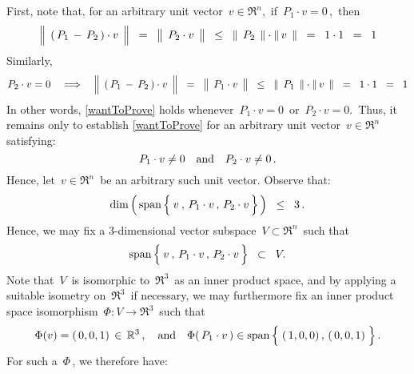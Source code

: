 First, note that, for an arbitrary unit vector \,$v \in \Re^{n}$,\,
if \,$P_{1} \cdot v = 0$\,,\, then
\begin{equation*}
\left\Vert\;\, (\,P_{1} \,\overset{{\color{white}.}}{-}\, P_{2}\,)\cdot v \,\;\right\Vert
\;\; = \;\;
	\left\Vert\;\, P_{2} \overset{{\color{white}.}}{\cdot} v \,\;\right\Vert
\;\; \leq \;\;
	\left\Vert\;\, P_{2} \,\;\right\Vert
	\cdot
	\left\Vert\, v \,\;\right\Vert
\;\; = \;\;
	1 \cdot 1
\;\; = \;\;
	1
\end{equation*}
Similarly,
\begin{equation*}
P_{2} \cdot v = 0
\quad\Longrightarrow\quad
\left\Vert\;\, (\,P_{1} \,\overset{{\color{white}.}}{-}\, P_{2}\,)\cdot v \,\;\right\Vert
\;\; = \;\;
	\left\Vert\;\, P_{1} \overset{{\color{white}.}}{\cdot} v \,\;\right\Vert
\;\; \leq \;\;
	\left\Vert\;\, P_{1} \,\;\right\Vert
	\cdot
	\left\Vert\, v \,\;\right\Vert
\;\; = \;\;
	1 \cdot 1
\;\; = \;\;
	1
\end{equation*}
In other words, \eqref{wantToProve} holds whenever
\,$P_{1}\cdot v = 0$\, or \,$P_{2}\cdot v = 0$.\,
Thus, it remains only to establish \eqref{wantToProve}
for an arbitrary unit vector \,$v \in \Re^{n}$\, satisfying:
\begin{equation}\label{caseAssumption}
P_{1} \cdot v \neq 0
\quad\textnormal{and}\quad
P_{2} \cdot v \neq 0\,.
\end{equation}
Hence, let \,$v \in \Re^{n}$\, be an arbitrary such unit vector.
Observe that:
\begin{equation*}
\dim\left(\,\span\left\{\,\overset{{\color{white}-}}{v} \,,\, P_{1}\cdot v \,,\, P_{2}\cdot v\,\right\}\,\right)
\;\; \leq \;\;
	3\,.
\end{equation*}
Hence, we may fix a $3$-dimensional vector subspace \,$V \subset \Re^{n}$\, such that
\begin{equation*}
\span\left\{\,\overset{{\color{white}-}}{v} \,,\, P_{1}\cdot v \,,\, P_{2}\cdot v\,\right\}
\;\; \subset \;\;
	V.
\end{equation*}
Note that \,$V$\, is isomorphic to \,$\Re^{3}$\, as an inner product space,
and by applying a suitable isometry on \,$\Re^{3}$\, if necessary,
we may furthermore fix an inner product space isomorphism \,$\Phi : V \longrightarrow \Re^{3}$\,
such that
\begin{equation*}
\Phi(v) = (\,0,0,1) \,\in\, \Re^{3}\,,
\quad\textnormal{and}\quad
\Phi(\,P_{1}\cdot v\,) \in \span\left\{\;(\,\overset{{\color{white}.}}{1},0,0) \,,\, (\,0,0,1)\;\right\}.
\end{equation*}
For such a \,$\Phi$\,, we therefore have:
